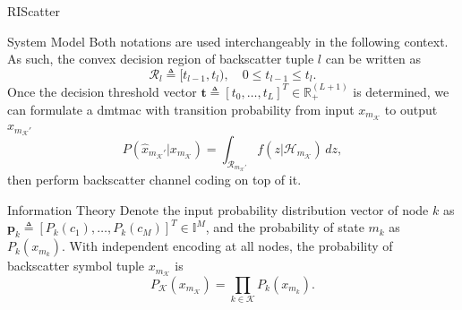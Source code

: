 \documentclass[journal]{IEEEtran}
\begin{document}
\begin{section}{RIScatter}
\begin{subsection}{System Model}
		Both notations are used interchangeably in the following context.
		As such, the convex decision region of backscatter tuple $l$ can be written as
		\begin{equation}
			\mathcal{R}_{l} \triangleq [t_{l-1},t_l), \quad 0 \le t_{l-1} \le t_l.
		\end{equation}
		Once the decision threshold vector $\boldsymbol{t} \triangleq [t_0,\ldots,t_L]^T \in \mathbb{R}_+^{(L+1)}$ is determined, we can formulate a \gls{dmtmac} with transition probability from input $x_{m_{\mathcal{K}}}$ to output $\hat{x}_{m_{\mathcal{K}}'}$
		\begin{equation}
			P(\hat{x}_{m_{\mathcal{K}}'}|x_{m_{\mathcal{K}}}) = \int_{\mathcal{R}_{m_{\mathcal{K}}'}} f(z|\mathcal{H}_{m_{\mathcal{K}}}) \, d z,
			\label{eq:dmtmac}
		\end{equation}
		then perform backscatter channel coding on top of it.
		\label{se:system_model}
	\end{subsection}

	\begin{subsection}{Information Theory}
		Denote the input probability distribution vector of node $k$ as $\boldsymbol{p}_k \triangleq [P_k(c_1),\ldots,P_k(c_M)]^T \in \mathbb{I}^{M}$, and the probability of state $m_k$ as $P_k(x_{m_k})$.
		With independent encoding at all nodes, the probability of backscatter symbol tuple $x_{m_{\mathcal{K}}}$ is
		\begin{equation}
			P_{\mathcal{K}}(x_{m_{\mathcal{K}}}) = \prod_{k \in \mathcal{K}} P_k(x_{m_k}).
			\label{eq:equivalent_distribution}
		\end{equation}


\end{subsection}
\end{section}
\end{document}
